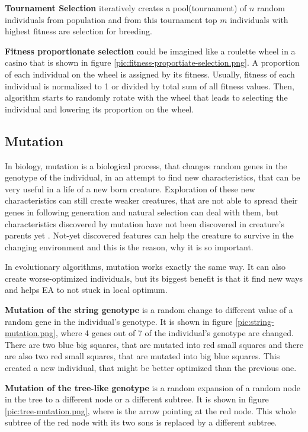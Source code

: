 
\textbf{Tournament Selection} iteratively creates a pool(tournament) of $n$ random individuals from population and from this tournament top $m$ individuals with highest fitness are selection for breeding.

\textbf{Fitness proportionate selection} could be imagined like a roulette wheel in a casino that is shown in figure  \ref{pic:fitness-proportiate-selection.png}. A proportion of each individual on the wheel is assigned by its fitness. Usually, fitness of each individual is normalized to 1 or divided by total sum of all fitness values. Then, algorithm starts to randomly rotate with the wheel that leads to selecting the individual and lowering its proportion on the wheel.


\subsection{Mutation}
In biology, mutation is a biological process, that changes random genes in the genotype of the individual, in an attempt to find new characteristics, that can be very useful in a life of a new born creature. Exploration of these new characteristics can still create weaker creatures, that are not able to spread their genes in following generation and natural selection can deal with them, but characteristics discovered by mutation have not been discovered in creature's parents yet . Not-yet discovered features can help the creature to survive in the changing environment and this is the reason, why it is so important.

In evolutionary algorithms, mutation works exactly the same way. It can also create worse-optimized individuals, but its biggest benefit is that it find new ways and helps EA to not stuck in local optimum.

\textbf{Mutation of the string genotype} is a random change to different value of a random gene in the individual's genotype. It is shown in figure \ref{pic:string-mutation.png}, where 4 genes out of 7 of the individual's genotype are changed. There are two blue big squares, that are mutated into red small squares and there are also two red small squares, that are mutated into big blue squares. This created a new individual, that might be better optimized than the previous one.

\textbf{Mutation of the tree-like genotype} is a random expansion of a random node in the tree to a different node or a different subtree. It is shown in figure \ref{pic:tree-mutation.png}, where is the arrow pointing at the red node. This whole subtree of the red node with its two sons is replaced by a different subtree.

